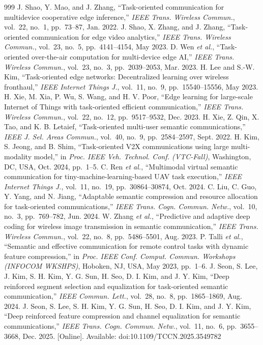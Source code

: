 \begin{thebibliography}{999}
 J. Shao, Y. Mao, and J. Zhang, ``Task-oriented communication for multidevice cooperative edge inference,'' \emph{IEEE Trans. Wireless Commun.}, vol.~22, no.~1, pp.~73--87, Jan. 2022.
 J. Shao, X. Zhang, and J. Zhang, ``Task-oriented communication for edge video analytics,'' \emph{IEEE Trans. Wireless Commun.}, vol.~23, no.~5, pp.~4141--4154, May 2023.
 D. Wen \emph{et al.}, ``Task-oriented over-the-air computation for multi-device edge AI,'' \emph{IEEE Trans. Wireless Commun.}, vol.~23, no.~3, pp.~2039--2053, Mar. 2023.
 H. Lee and S.-W. Kim, ``Task-oriented edge networks: Decentralized learning over wireless fronthaul,'' \emph{IEEE Internet Things J.}, vol.~11, no.~9, pp.~15540--15556, May 2023.
 H. Xie, M. Xia, P. Wu, S. Wang, and H. V. Poor, ``Edge learning for large-scale Internet of Things with task-oriented efficient communication,'' \emph{IEEE Trans. Wireless Commun.}, vol.~22, no.~12, pp.~9517--9532, Dec. 2023.
 H. Xie, Z. Qin, X. Tao, and K. B. Letaief, ``Task-oriented multi-user semantic communications,'' \emph{IEEE J. Sel. Areas Commun.}, vol.~40, no.~9, pp.~2584--2597, Sept. 2022.
 H. Kim, S. Jeong, and B. Shim, ``Task-oriented V2X communications using large multi-modality model,'' in \emph{Proc. IEEE Veh. Technol. Conf. (VTC-Fall)}, Washington, DC, USA, Oct. 2024, pp.~1--5.
 C. Ren \emph{et al.}, ``Multimodal virtual semantic communication for tiny-machine-learning-based UAV task execution,'' \emph{IEEE Internet Things J.}, vol.~11, no.~19, pp.~30864--30874, Oct. 2024.
 C. Liu, C. Guo, Y. Yang, and N. Jiang, ``Adaptable semantic compression and resource allocation for task-oriented communications,'' \emph{IEEE Trans. Cogn. Commun. Netw.}, vol.~10, no.~3, pp.~769--782, Jun. 2024.
 W. Zhang \emph{et al.}, ``Predictive and adaptive deep coding for wireless image transmission in semantic communication,'' \emph{IEEE Trans. Wireless Commun.}, vol.~22, no.~8, pp.~5486--5501, Aug. 2023.
 P. Talli \emph{et al.}, ``Semantic and effective communication for remote control tasks with dynamic feature compression,'' in \emph{Proc. IEEE Conf. Comput. Commun. Workshops (INFOCOM WKSHPS)}, Hoboken, NJ, USA, May 2023, pp.~1--6.
 J. Seon, S. Lee, J. Kim, S. H. Kim, Y. G. Sun, H. Seo, D. I. Kim, and J. Y. Kim, ``Deep reinforced segment selection and equalization for task-oriented semantic communication,'' \emph{IEEE Commun. Lett.}, vol.~28, no.~8, pp.~1865--1869, Aug. 2024.
 J. Seon, S. Lee, S. H. Kim, Y. G. Sun, H. Seo, D. I. Kim, and J. Y. Kim, ``Deep reinforced feature compression and channel equalization for semantic communications,'' \emph{IEEE Trans. Cogn. Commun. Netw.}, vol.~11, no.~6, pp.~3655--3668, Dec. 2025. [Online]. Available: doi:10.1109/TCCN.2025.3549782

\end{thebibliography}
